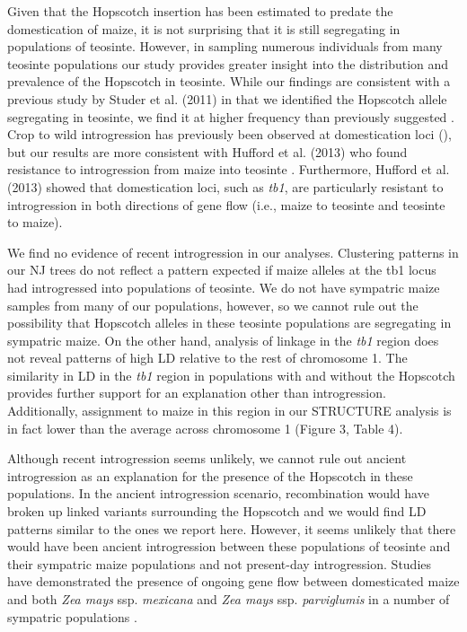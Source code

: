 \documentclass[12pt]{article}
\begin{document}
Given that the Hopscotch insertion has been estimated to predate the domestication of maize, it is not surprising that it is still segregating in populations of teosinte. However, in sampling numerous individuals from many teosinte populations our study provides greater insight into the distribution and prevalence of the Hopscotch in teosinte. While our findings are consistent with a previous study by Studer et al. (2011) in that we identified the Hopscotch allele segregating in teosinte, we find it at higher frequency than previously suggested \cite{Studer et al 2011}. Crop to wild introgression has previously been observed at domestication loci (\cite{Ellstrand et al 1999, Zhang et al 2009, Thurber et al 2010, Baack et al 2008, Hubner et al 2012, Wilkes et al 1977, Van Heerwaarden et al 2011, Barrett 1983}), but our results are more consistent with Hufford et al. (2013) who found resistance to introgression from maize into teosinte \cite{Hufford et al 2013}. Furthermore, Hufford et al. (2013) showed that domestication loci, such as \emph{tb1}, are particularly resistant to introgression in both directions of gene flow (i.e., maize to teosinte and teosinte to maize). 

We find no evidence of recent introgression in our analyses. Clustering patterns in our NJ trees do not reflect a pattern expected if maize alleles at the tb1 locus had introgressed into populations of teosinte. We do not have sympatric maize samples from many of our populations, however, so we cannot rule out the possibility that Hopscotch alleles in these teosinte populations are segregating in sympatric maize. On the other hand, analysis of linkage in the \emph{tb1} region does not reveal patterns of high LD relative to the rest of chromosome 1. The similarity in LD in the \emph{tb1} region in populations with and without the Hopscotch provides further support for an explanation other than introgression. Additionally, assignment to maize in this region in our STRUCTURE analysis is in fact lower than the average across chromosome 1 (Figure 3, Table 4).

Although recent introgression seems unlikely, we cannot rule out ancient introgression as an explanation for the presence of the Hopscotch in these populations. In the ancient introgression scenario, recombination would have broken up linked variants surrounding the Hopscotch and we would find LD patterns similar to the ones we report here. However, it seems unlikely that there would have been ancient introgression between these populations of teosinte and their sympatric maize populations and not present-day introgression. Studies have demonstrated the presence of ongoing gene flow between domesticated maize and both \emph{Zea mays} ssp. \emph{mexicana} and \emph{Zea mays} ssp. \emph{parviglumis} in a number of sympatric populations \cite{Hufford et al 2013, Ellstrand et al 2007, van Heerwaarden et al 2011}. 
\end{document}
